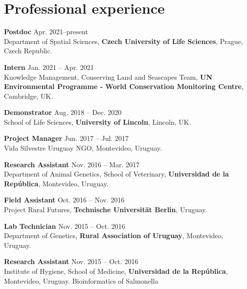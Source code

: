 \HRule

\section{Professional experience}

\begin{innerlist}

\item[]{\bf Postdoc}
\hfill {Apr. 2021--present} \\
Department of Spatial Sciences, {\bf Czech University of Life Sciences}, Prague, Czech Republic.\\

\item[]{\bf Intern}
\hfill {Jan. 2021 -- Apr. 2021} \\
Knowledge Management, Conserving Land and Seascapes Team, {\bf UN Environmental Programme - World Conservation Monitoring Centre}, Cambridge, UK.\\

\item[]{\bf Demonstrator}
\hfill {Aug. 2018 -- Dec. 2020} \\
School of Life Sciences, {\bf University of Lincoln}, Lincoln, UK.\\

\item[]{\bf Project Manager}
\hfill {Jun. 2017 -- Jul. 2017} \\
Vida Silvestre Uruguay NGO, Montevideo, Uruguay.\\

\item[]{\bf Research Assistant}
\hfill {Nov. 2016 -- Mar. 2017} \\
Department of Animal Genetics, School of Veterinary, {\bf Universidad de la Rep\'{u}blica}, Montevideo, Uruguay.\\

\item[]{\bf Field Assistant}
\hfill {Oct. 2016 -- Nov. 2016 } \\
Project Rural Futures, {\bf Technische Universität Berlin}, Uruguay.\\

\item[]{\bf Lab Technician}
\hfill {Nov. 2015 -- Oct. 2016}\\
Department of Genetics, {\bf Rural Association of Uruguay}, Montevideo, Uruguay.\\

\item[]{\bf Research Assistant}
\hfill {Nov. 2015 -- Oct. 2016}\\
Institute of Hygiene, School of Medicine, {\bf Universidad de la Rep\'{u}blica}, Montevideo, Uruguay. Bioinformatics of Salmonella\\


\end{innerlist}
